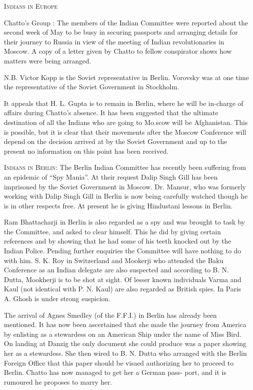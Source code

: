 \textsc{Indians in Europe}

Chatto’s Group : The members of the Indian Committee were reported about the second week of May to be busy in securing passports and arranging details for their journey to Russia in view of the meeting of Indian revolutionaries in Moscow. A copy of a letter given by Chatto to fellow conspirator shows how matters were being arranged. 


N.B. Victor Kopp is the Soviet representative in Berlin. Vorovsky was at one time the representative of the Soviet Government in Stockholm. 

It appeals that H. L. Gupta is to remain in Berlin, where he will be in-charge of affairs during Chatto’s absence. It has been suggested that the ultimate destination of all the Indians who are going to Mo.scow will be Afghanistan. This is possible, but it is clear that their movements after the Moscow Conference will depend on the decision arrived at by the Soviet Government and up to the present no information on this point has been received.

\textsc{Indians in Berlin:} The Berlin Indian Committee has recently been suffering from an epidemic of “Spy Mania”. At their request Dalip Singh Gill has been imprisoned by the Soviet Government in Moscow. Dr. Mansur, who was formerly working with Dalip Singh Gill in Berlin is now 
being carefully watched though he is in other respects free. At present he is giving Hindustani lessons in Berlin. 

Ram Bhattacharji in Berlin is also regarded as a spy and was brought to task by the Committee, and asked to clear himself. This he did by giving certain references and by showing that he had some of his teeth knocked out by the Indian Police. Pending further enquiries the Committee will have nothing to do with him. S. K. Roy in Switzerland and Mookerji who attended the Baku Conference as an Indian delegate are 
also suspected and according to B. N. Dutta, Mookherji is to be shot at sight. Of lesser known individuals Varma and Kaul (not identical with P. N. Kaul) are also regarded as British spies. In Paris A. Ghosh is under strong suspicion. 

The arrival of Agnes Smedley (of the F.F.I.) in Berlin has already been mentioned. It has now been ascertained that she made the journey from America by enlisting as a stewardess on an American Ship under the name of Miss Bird. On landing at Danzig the only document she could produce was a paper showing her as a stewardess. She then wired to B. N. Dutta who arranged with the Berlin Foreign Office that this paper should be visaed authorizing her to proceed to Berlin. Chatto has now managed to get her a German pass- port, and it is rumoured he proposes to marry her. \\


